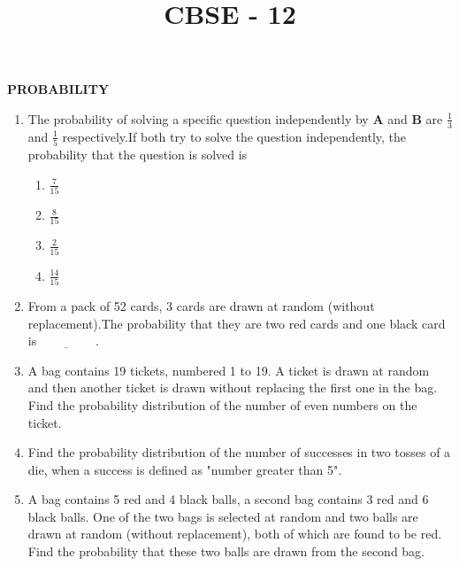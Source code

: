 \documentclass{article}
\let\vec\mathbf{}
\begin{document}
\begin{center}
\title{CBSE - 12\\ \vspace{\baselineskip}}
\date{}
\maketitle
\begin{center}
 \textbf{PROBABILITY}
\end{center}
\vspace{\baselineskip}
\vspace{\baselineskip}
\end{center}
\begin{enumerate}
    \item The probability of solving a specific question independently by $\vec{A}$ and $\vec{B}$ are $\frac{1}{3}$ and $\frac{1}{5}$ respectively.If both try to solve the question independently, the probability that the question is solved is
    \begin{enumerate}
        \item $\frac{7}{15}$
        \item $\frac{8}{15}$
        \item $\frac{2}{15}$
        \item $\frac{14}{15}$
    \end{enumerate}
    \vspace{\baselineskip}
    \item From a pack of 52 cards, 3 cards are drawn at random (without replacement).The probability that they are two red cards and one black card is$\underline{\hspace{2cm}}$.\\
    \item A bag contains 19 tickets, numbered 1 to 19. A ticket is drawn at random and then another ticket is drawn without replacing the first one in the bag. Find the probability distribution of the number of even numbers on the ticket.\\
   
    \item Find the probability distribution of the number of successes in two tosses of a die, when a success is defined as "number greater than 5".\\
    \item A bag contains 5 red and 4 black balls, a second bag contains 3 red and 6 black balls. One of the two bags is selected at random and two balls are drawn at random (without replacement), both of which are found to be red. Find the probability that these two balls are drawn from the second bag.\\
   

\end{enumerate}
\end{document}
